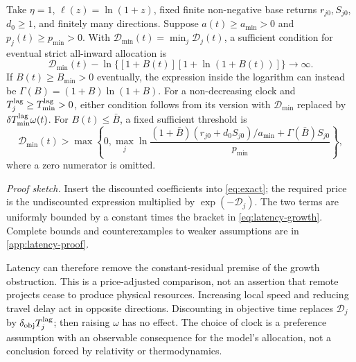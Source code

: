 \begin{proposition}
\label{prop:latency}
Take $\eta=1$, $\ell(z)=\ln(1+z)$, fixed finite non-negative base returns
$r_{j0},S_{j0}$, $d_0\geq1$, and finitely many directions. Suppose
$a(t)\geq a_{\min}>0$ and $p_j(t)\geq p_{\min}>0$. With
$\mathcal D_{\min}(t)=\min_j\mathcal D_j(t)$, a sufficient condition for eventual strict
all-inward allocation is
\begin{equation}
 \mathcal D_{\min}(t)-\ln\{[1+B(t)][1+\ln(1+B(t))]\}\longrightarrow\infty.
 \label{eq:latency-growth}
\end{equation}
If $B(t)\geq B_{\min}>0$ eventually, the expression inside the logarithm
can instead be $\Gamma(B)=(1+B)\ln(1+B)$. For a non-decreasing clock
and $T_j^{\rm lag}\geq T_{\min}^{\rm lag}>0$, either condition follows
from its version with $\mathcal D_{\min}$ replaced by
$\delta T_{\min}^{\rm lag}\omega(t)$.
For $B(t)\leq\bar B$, a fixed sufficient threshold is
\begin{equation}
 \mathcal D_{\min}(t)>
 \max\left\{0,\max_j\ln\frac{(1+\bar B)(r_{j0}+d_0S_{j0})/a_{\min}
                   +\Gamma(\bar B)S_{j0}}{p_{\min}}\right\},
 \label{eq:latency-bounded}
\end{equation}
where a zero numerator is omitted.
\end{proposition}
\noindent\emph{Proof sketch.}
Insert the discounted coefficients into \cref{eq:exact}; the required
price is the undiscounted expression multiplied by $\exp(-\mathcal D_j)$.
The two terms are uniformly bounded by a constant times the bracket in
\cref{eq:latency-growth}. Complete bounds and counterexamples to weaker
assumptions are in \cref{app:latency-proof}.

Latency can therefore remove the constant-residual premise of the growth
obstruction. This is a price-adjusted comparison, not an assertion that
remote projects cease to produce physical resources. Increasing local
speed and reducing travel delay act in opposite directions. Discounting
in objective time replaces $\mathcal D_j$ by $\delta_{\rm obj}T_j^{\rm lag}$;
then raising $\omega$ has no effect. The choice of clock is a preference
assumption with an observable consequence for the model's allocation,
not a conclusion forced by relativity or thermodynamics.

